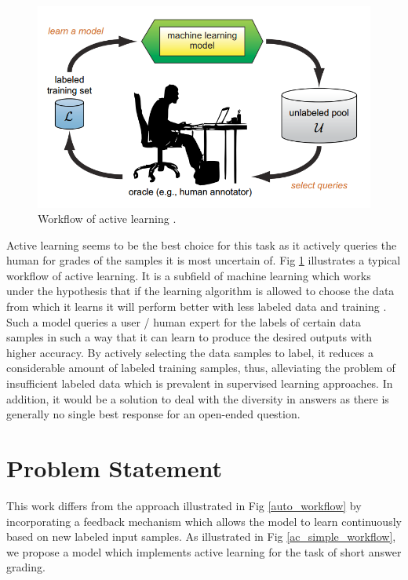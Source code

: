 \documentclass[rnd]{mas_proposal}
\begin{document}
\begin{figure}[h!]
    \includegraphics[width=\textwidth]{images/active_learning}
    \caption{Workflow of active learning \cite{Settles2010}.}
    \label{ac_workflow}
\end{figure}

Active learning seems to be the best choice for this task as it actively queries the human for grades of the samples it is most uncertain of. Fig \ref{ac_workflow} illustrates a typical workflow of active learning. It is a subfield of machine learning which works under the hypothesis that if the learning algorithm is allowed to choose the data from which it learns it will perform better with less labeled data and training \cite{Settles2010}. Such a model queries a user / human expert for the labels of certain data samples in such a way that it can learn to produce the desired outputs with higher accuracy. By actively selecting the data samples to label, it reduces a considerable amount of labeled training samples, thus, alleviating the problem of insufficient labeled data which is prevalent in supervised learning approaches. In addition, it would be a solution to deal with the diversity in answers as there is generally no single best response for an open-ended question.   

\newpage
\section{Problem Statement}

This work differs from the approach illustrated in Fig \ref{auto_workflow} by incorporating a feedback mechanism which allows the model to learn continuously based on new labeled input samples. As illustrated in Fig \ref{ac_simple_workflow}, we propose a model which implements active learning for the task of short answer grading.  
\end{document}
